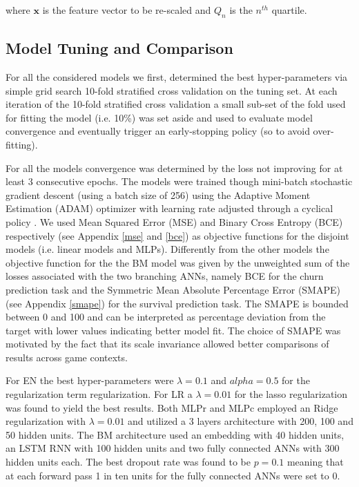 where $\mathbf{x}$ is the feature vector to be re-scaled and $Q_n$ is the $n^{th}$ quartile. 

\subsection{Model Tuning and Comparison}
\label{tuning_comparison_1}
For all the considered models we first, determined the best hyper-parameters via simple grid search 10-fold stratified cross validation \cite{scikit-learn} on the tuning set. At each iteration of the 10-fold stratified cross validation a small sub-set of the fold used for fitting the model (i.e. 10\%) was set aside and used to evaluate model convergence and eventually trigger an early-stopping policy (so to avoid over-fitting). 

For all the models convergence was determined by the loss not improving for at least 3 consecutive epochs. The models were trained though mini-batch stochastic gradient descent (using a batch size of 256) using the Adaptive Moment Estimation (ADAM) optimizer \cite{kingma2014adam} with learning rate adjusted through a cyclical policy \cite{smith2017cyclical, chollet2015keras}. We used Mean Squared Error (MSE) and Binary Cross Entropy (BCE) respectively (see Appendix \ref{mse} and \ref{bce}) as objective functions for the disjoint models (i.e. linear models and MLPs). Differently from the other models the objective function for the the BM model was given by the unweighted sum of the losses associated with the two branching ANNs, namely BCE for the churn prediction task and the Symmetric Mean Absolute Percentage Error (SMAPE) (see Appendix \ref{smape}) for the survival prediction task. The SMAPE is bounded between 0 and 100 and can be interpreted as percentage deviation from the target with lower values indicating better model fit. The choice of SMAPE was motivated by the fact that its scale invariance allowed better comparisons of results across game contexts. 

For EN the best hyper-parameters were $\lambda = 0.1$ and $alpha=0.5$ for the regularization term regularization. For LR a $\lambda = 0.01$ for the lasso regularization was found to yield the best results. Both MLPr and MLPc employed an Ridge regularization with $\lambda=0.01$ and utilized a 3 layers architecture with 200, 100 and 50 hidden units. The BM architecture used an embedding with 40 hidden units, an LSTM RNN with 100 hidden units and two fully connected ANNs with 300 hidden units each. The best dropout rate was found to be $p=0.1$ meaning that at each forward pass 1 in ten units for the fully connected ANNs were set to 0. 

